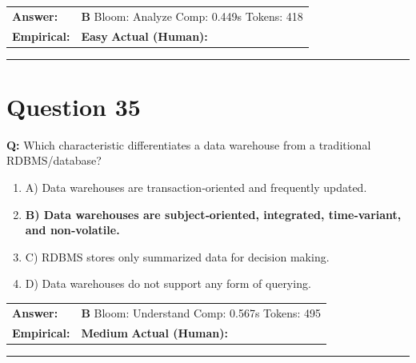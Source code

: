 \documentclass[9pt]{article}
\begin{document}
\begin{tabular}{@{}l p{10.5cm}@{}}
\textbf{Answer:} & \textbf{B} \hspace{1em} Bloom: Analyze \hspace{1em} Comp: 0.449s \hspace{1em} Tokens: 418 \\
\textbf{Empirical:} & \textbf{Easy} \hspace{1em} \textbf{Actual (Human):} \underline{\hspace{5cm}}
\end{tabular}

\vspace{0.2cm}
\rule{\textwidth}{0.4pt}
\vspace{0.2cm}


\section*{Question 35}

\textbf{Q:} Which characteristic differentiates a data warehouse from a traditional RDBMS/database?

\begin{enumerate}[label=\textbf{\alph{*})}, nosep]
    \item A) Data warehouses are transaction‑oriented and frequently updated.
    \item \textbf{B) Data warehouses are subject‑oriented, integrated, time‑variant, and non‑volatile.} %
    \item C) RDBMS stores only summarized data for decision making.
    \item D) Data warehouses do not support any form of querying.

\end{enumerate}

\begin{tabular}{@{}l p{10.5cm}@{}}
\textbf{Answer:} & \textbf{B} \hspace{1em} Bloom: Understand \hspace{1em} Comp: 0.567s \hspace{1em} Tokens: 495 \\
\textbf{Empirical:} & \textbf{Medium} \hspace{1em} \textbf{Actual (Human):} \underline{\hspace{5cm}}
\end{tabular}

\vspace{0.2cm}
\rule{\textwidth}{0.4pt}
\vspace{0.2cm}
\end{document}
